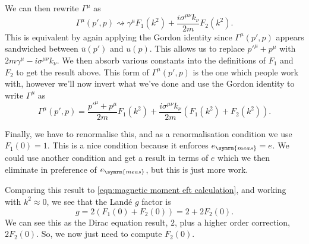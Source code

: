 \documentclass[fleqn]{NotesClass}
\newcommand{\diracadjoint}[1]{\overbar{#1}}
\newcommand{\measured}{\symrm{meas}}
\begin{document}
    We can then rewrite \(\Gamma^\mu\) as
    \begin{equation}
        \Gamma^\mu(p', p) \rightsquigarrow \gamma^\mu F_1(k^2) + \frac{i\sigma^{\mu\nu}k_\nu}{2m}F_2(k^2).
    \end{equation}
    This is equivalent by again applying the Gordon identity since \(\Gamma^\mu(p', p)\) appears sandwiched between \(\diracadjoint{u}(p')\) and \(u(p)\).
    This allows us to replace \(p'^\mu + p^\mu\) with \(2m\gamma^\mu - i\sigma^{\mu\nu}k_\nu\).
    We then absorb various constants into the definitions of \(F_1\) and \(F_2\) to get the result above.
    This form of \(\Gamma^\mu(p', p)\) is the one which people work with, however we'll now invert what we've done and use the Gordon identity to write \(\Gamma^\mu\) as
    \begin{equation}
        \Gamma^\mu(p', p) = \frac{p'^\mu + p^\mu}{2m} F_1(k^2) + \frac{i\sigma^{\mu\nu}k_\nu}{2m}(F_1(k^2) + F_2(k^2)).
    \end{equation}
    
    Finally, we have to renormalise this, and as a renormalisation condition we use \(F_1(0) = 1\).
    This is a nice condition because it enforces \(e_{\measured} = e\).
    We could use another condition and get a result in terms of \(e\) which we then eliminate in preference of \(e_{\measured}\), but this is just more work.
    
    Comparing this result to \cref{eqn:magnetic moment eft calculation}, and working with \(k^2 \approx 0\), we see that the Land\'e \(g\) factor is
    \begin{equation}
        g = 2(F_1(0) + F_2(0)) = 2 + 2F_2(0).
    \end{equation}
    We can see this as the Dirac equation result, \(2\), plus a higher order correction, \(2F_2(0)\).
    So, we now just need to compute \(F_2(0)\).
    
\end{document}

